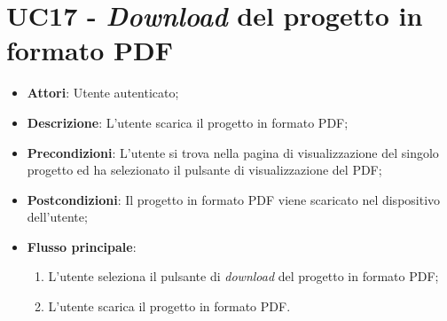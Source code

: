 \section*{UC17 - \textit{Download} del progetto in formato PDF}
\begin{itemize}
    \item \textbf{Attori}: Utente autenticato;
    \item \textbf{Descrizione}: L'utente scarica il progetto in formato PDF;
    \item \textbf{Precondizioni}: L’utente si trova nella pagina di visualizzazione del singolo progetto ed ha selezionato il pulsante di visualizzazione del PDF;
    \item \textbf{Postcondizioni}: Il progetto in formato PDF viene scaricato nel dispositivo dell'utente;
    \item \textbf{Flusso principale}:
    \begin{enumerate}
        \item L’utente seleziona il pulsante di \textit{download} del progetto in formato PDF;
        \item L'utente scarica il progetto in formato PDF.
    \end{enumerate}
\end{itemize}

\vspace{0.5cm}  
